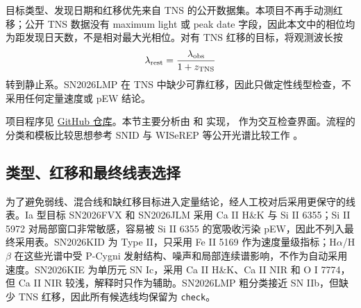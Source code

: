 \documentclass[11pt]{article}
\newcommand{\code}[1]{\texttt{#1}}
\begin{document}
目标类型、发现日期和红移优先来自 TNS 的公开数据集。本项目不再手动测红移；公开 TNS 数据没有 maximum light 或 peak date 字段，因此本文中的相位均为距发现日天数，不是相对最大光相位。对有 TNS 红移的目标，将观测波长按
\[
\lambda_{\rm rest}=\frac{\lambda_{\rm obs}}{1+z_{\rm TNS}}
\]
转到静止系。SN2026LMP 在 TNS 中缺少可靠红移，因此只做定性线型检查，不采用任何定量速度或 pEW 结论。

项目程序见 \href{https://github.com/Zzzaurak/obsastro-sn-pipeline}{GitHub 仓库}。本节主要分析由  和  实现， 作为交互检查界面。流程的分类和模板比较思想参考 SNID 与 WISeREP 等公开光谱比较工作 \cite{blondinDeterminingTypeRedshift2007,yaronWISeREPInteractiveSupernova2012}。

\subsection{类型、红移和最终线表选择}
为了避免弱线、混合线和缺红移目标进入定量结论，经人工校对后采用更保守的线表。Ia 型目标 SN2026FVX 和 SN2026JLM 采用 Ca II H\&K 与 Si II 6355；Si II 5972 对局部窗口非常敏感，容易被 Si II 6355 的宽吸收污染 pEW，因此不列入最终采用表。SN2026KID 为 Type II，只采用 Fe II 5169 作为速度量级指标；H$\alpha$/H$\beta$ 在这些光谱中受 P-Cygni 发射结构、噪声和局部连续谱影响，不作为自动采用速度。SN2026KIE 为单历元 SN Ic，采用 Ca II H\&K、Ca II NIR 和 O I 7774，但 Ca II NIR 较浅，解释时只作为辅助。SN2026LMP 粗分类接近 SN IIb，但缺少 TNS 红移，因此所有候选线均保留为 \code{check}。

\begin{table}[htbp]
\centering
\caption{本节采用的目标级状态和最终线表。相位为距 TNS 发现日天数。From code by Ziheng Zhang.}
\label{tab:target-status}
\end{table}
\end{document}
